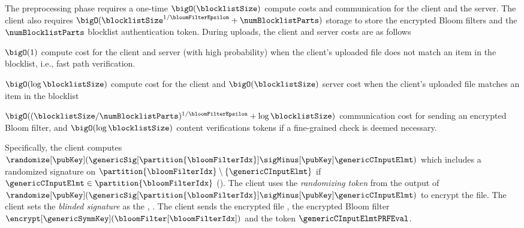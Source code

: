%
The preprocessing phase requires a one-time $\bigO(\blocklistSize)$ compute costs and communication for the client and the server. The client also requires $\bigO(\blocklistSize^{1/\bloomFilterEpsilon} + \numBlocklistParts)$ storage to store the encrypted Bloom filters and the $\numBlocklistParts$ blocklist authentication token. During uploads, the client and server costs are as follows


\itemListStart
\item $\bigO(1)$ compute cost for the client and server (with high probability) when the client's uploaded file does not match an item in the blocklist, i.e., fast path verification.
\item $\bigO(\log \blocklistSize)$ compute cost for the client and $\bigO(\blocklistSize)$ server cost when the client's uploaded file matches an item in the blocklist
\item $\bigO((\blocklistSize/\numBlocklistParts)^{1/\bloomFilterEpsilon} + \log \blocklistSize)$ communication cost for sending an encrypted Bloom filter, and $\bigO(\log \blocklistSize)$ content verifications tokens if a fine-grained check is deemed necessary. 
\itemListEnd

\iffalse 
Specifically, the client computes $\randomize[\pubKey](\genericSig[\partition{\bloomFilterIdx}] \sigMinus[\pubKey] \genericCInputElmt)$ which includes a randomized signature on $\partition{\bloomFilterIdx} \setminus \{\genericCInputElmt\}$ if $\genericCInputElmt \in \partition{\bloomFilterIdx}$ (). The client uses the \emph{randomizing token} from the output of $\randomize[\pubKey](\genericSig[\partition{\bloomFilterIdx}] \sigMinus[\pubKey] \genericCInputElmt)$ to encrypt the file. 
The client sets the \emph{blinded signature} as the \contentToken, \cOutputMeta. The client sends the encrypted file \cOutputFile, the encrypted Bloom filter $\encrypt[\genericSymmKey](\bloomFilter[\bloomFilterIdx])$ and the token $\genericCInputElmtPRFEval$. 




